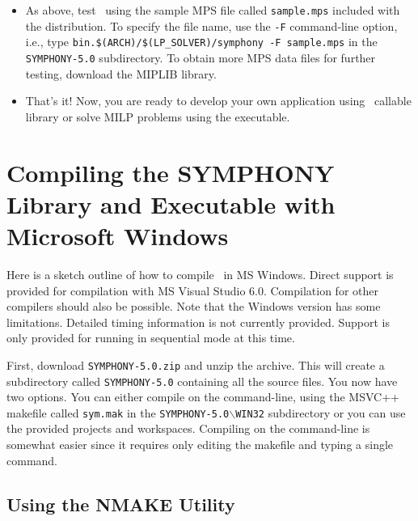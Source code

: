 \begin{itemize}
        \item As above, test \BB\ using the sample MPS file called
        \texttt{sample.mps} included with the distribution. To specify the
        file name, use the \texttt{-F} command-line option, i.e., type
        \texttt{bin.\$(ARCH)/\$(LP\_SOLVER)/symphony -F sample.mps} in the
        \texttt{SYMPHONY-5.0} subdirectory. To obtain more MPS data files
        for further testing, download the MIPLIB library.

        \item That's it! Now, you are ready to develop your own application 
	using \BB\ callable library or solve MILP problems using the 
	executable.

\end{itemize}


\section{Compiling the SYMPHONY Library and Executable with Microsoft Windows}
\label{getting_started_windows}

Here is a sketch outline of how to compile \BB\ in MS Windows. Direct
support is provided for compilation with MS Visual Studio 6.0. Compilation for
other compilers should also be possible. Note that the Windows version has
some limitations. Detailed timing information is not currently provided.
Support is only provided for running in sequential mode at this time.

First, download \texttt{SYMPHONY-5.0.zip} and unzip the archive. This will
create a subdirectory called \texttt{SYMPHONY-5.0} containing all
the source files. You now have two options. You can either compile on the
command-line, using the MSVC++ makefile called
\texttt{sym.mak} in the \texttt{SYMPHONY-5.0$\backslash$WIN32} subdirectory or 
you can use the provided projects and workspaces. Compiling on the command-line 
is somewhat easier since it requires only editing the makefile and typing a
single command.

\subsection{Using the NMAKE Utility}
\label{using_nmake}

